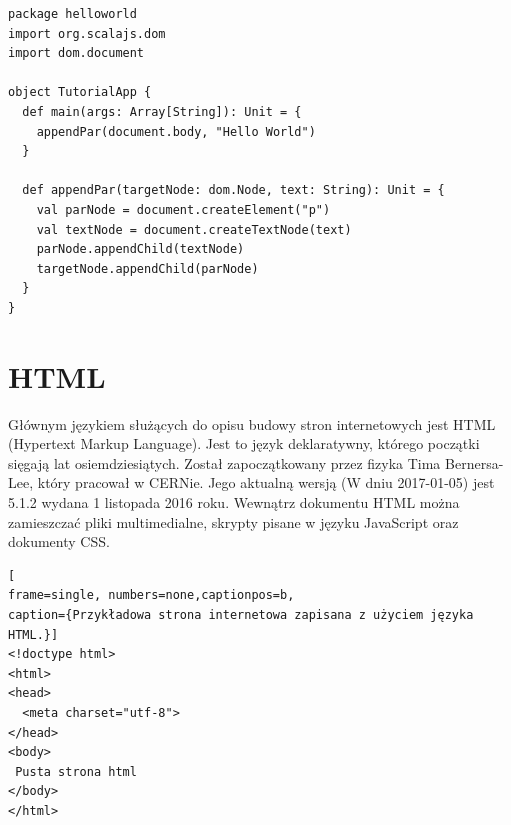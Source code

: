\begin{minipage}{\linewidth}
\begin{lstlisting}[label={lst:helloscalajs},
frame=single, numbers=none,captionpos=b, 
caption={Przykładowy projekt w Scali.js wypisujący napis Hello World na stronie.}]
package helloworld
import org.scalajs.dom
import dom.document

object TutorialApp {
  def main(args: Array[String]): Unit = {
    appendPar(document.body, "Hello World")
  }

  def appendPar(targetNode: dom.Node, text: String): Unit = {
    val parNode = document.createElement("p")
    val textNode = document.createTextNode(text)
    parNode.appendChild(textNode)
    targetNode.appendChild(parNode)
  }
}
\end{lstlisting}
\end{minipage}


\newpage
{\let\cleardoublepage\relax \chapter{HTML}}

Głównym językiem służących do opisu budowy stron internetowych jest HTML (Hypertext Markup Language). Jest to język deklaratywny, którego początki sięgają lat osiemdziesiątych. Został zapoczątkowany przez fizyka Tima Bernersa-Lee, który pracował w CERNie. Jego aktualną wersją (W dniu 2017-01-05) jest 5.1.2 wydana 1 listopada 2016 roku. Wewnątrz dokumentu HTML można zamieszczać pliki multimedialne, skrypty pisane w języku JavaScript oraz dokumenty CSS.





\begin{minipage}{\linewidth}
\begin{lstlisting}[
frame=single, numbers=none,captionpos=b, 
caption={Przykładowa strona internetowa zapisana z użyciem języka HTML.}]
<!doctype html>
<html>
<head>
  <meta charset="utf-8">
</head>
<body>
 Pusta strona html
</body>
</html>
\end{lstlisting}
\end{minipage}